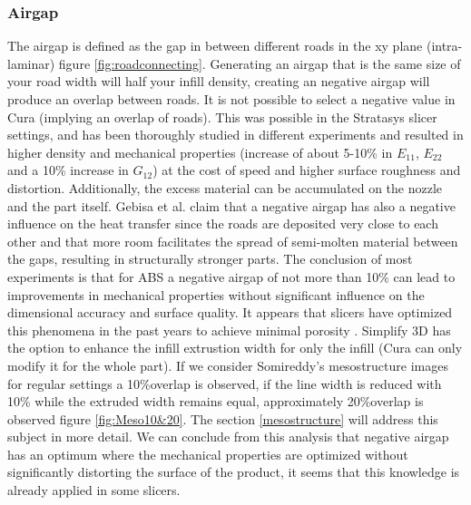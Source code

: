 \subsubsection{Airgap}
The airgap is defined as the gap in between different roads in the xy plane (intra-laminar) figure \ref{fig:roadconnecting}. Generating an airgap that is the same size of your road width will half your infill density, creating an negative airgap will produce an overlap between roads. It is not possible to select a negative value in Cura (implying an overlap of roads). This was possible in the Stratasys slicer settings, and has been thoroughly studied in different experiments \cite{Somireddy2017MechanicalMesostructure}  \cite{Rodriguez2001MechanicalInvestigation}   \cite{Ahn2002AnisotropicABS}  \cite{Dawoud2016MechanicalTechniques} \cite{Gebisa2018InvestigatingExperiment}
\cite{HossainImprovingParameters}
and resulted in higher density and mechanical properties (increase of about 5-10\% in $E_{11}$, $E_{22}$ and a 10\% increase in $G_{12}$) at the cost of speed and higher surface roughness and distortion. Additionally, the excess material can be accumulated on the nozzle and the part itself. Gebisa et al. \cite{Gebisa2018InvestigatingExperiment} claim that a negative airgap has also a negative influence on the heat transfer since the roads are deposited very close to each other and that more room facilitates the spread of semi-molten material between the gaps, resulting in structurally stronger parts. The conclusion of most experiments is that for ABS a negative airgap of not more than 10\% can lead to improvements in mechanical properties without significant influence on the dimensional accuracy and surface quality. It appears that  slicers have optimized this phenomena in the past years to achieve minimal porosity \cite{GaryHodgsonSlic3rMath}. Simplify 3D has the option to enhance the infill extrustion width for only the infill (Cura can only modify it for the whole part).
If we consider Somireddy's \cite{Somireddy2017MechanicalMesostructure} mesostructure images for regular settings a 10\%overlap is observed,  if the line width is reduced with 10\% while the extruded width remains equal,  approximately 20\%overlap is observed figure \ref{fig:Meso10&20}. The section \ref{mesostructure} will address this subject in more detail.
We can conclude from this analysis that negative airgap has an optimum where the mechanical properties are optimized without significantly distorting the surface of the product, it seems that this knowledge is already applied in some slicers. 

